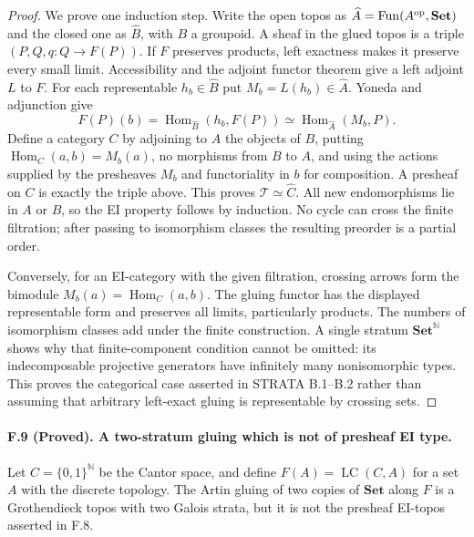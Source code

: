 \begin{proof}
We prove one induction step. Write the open topos as
$\widehat A=\operatorname{Fun}(A^{\rm op},\mathbf{Set})$ and the closed
one as $\widehat B$, with $B$ a groupoid. A sheaf in the glued topos is a
triple $(P,Q,q:Q\to F(P))$. If $F$ preserves products, left exactness
makes it preserve every small limit. Accessibility and the adjoint
functor theorem give a left adjoint $L$ to $F$. For each representable
$h_b\in\widehat B$ put $M_b=L(h_b)\in\widehat A$. Yoneda and adjunction
give
\[
 F(P)(b)=\operatorname{Hom}_{\widehat B}(h_b,F(P))
          \simeq\operatorname{Hom}_{\widehat A}(M_b,P).
\]
Define a category $C$ by adjoining to $A$ the objects of $B$, putting
$\operatorname{Hom}_C(a,b)=M_b(a)$, no morphisms from $B$ to $A$, and
using the actions supplied by the presheaves $M_b$ and functoriality in
$b$ for composition. A presheaf on $C$ is exactly the triple above.
This proves $\mathcal T\simeq\widehat C$. All new endomorphisms lie in
$A$ or $B$, so the EI property follows by induction. No cycle can cross
the finite filtration; after passing to isomorphism classes the resulting
preorder is a partial order.

Conversely, for an EI-category with the given filtration, crossing arrows
form the bimodule $M_b(a)=\operatorname{Hom}_C(a,b)$. The gluing functor
has the displayed representable form and preserves all limits,
particularly products. The numbers of isomorphism classes add under the
finite construction. A single stratum $\mathbf{Set}^{\mathbb N}$ shows
why that finite-component condition cannot be omitted: its indecomposable
projective generators have infinitely many nonisomorphic types.
This proves the categorical case asserted in STRATA B.1--B.2 rather than
assuming that arbitrary left-exact gluing is representable by crossing
sets.
\end{proof}

\paragraph{F.9 (Proved). A two-stratum gluing which is not of presheaf EI type.}
Let $C=\{0,1\}^{\mathbb N}$ be the Cantor space, and define
$F(A)=\operatorname{LC}(C,A)$ for a set $A$ with the discrete topology.
The Artin gluing of two copies of $\mathbf{Set}$ along $F$ is a
Grothendieck topos with two Galois strata, but it is not the presheaf
EI-topos asserted in F.8.

